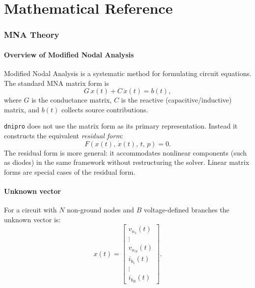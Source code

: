 \documentclass[11pt,a4paper]{article}
\newcommand{\project}{\texttt{dnipro}}
\newcommand{\mna}{Modified Nodal Analysis}
\begin{document}
\part{Mathematical Reference}

\section{MNA Theory}
\label{sec:mna-theory}

\subsection{Overview of Modified Nodal Analysis}

\mna{} is a systematic method for formulating circuit equations.
The standard MNA matrix form is
\begin{equation}
    G\,x(t) + C\,\dot{x}(t) = b(t),
\end{equation}
where \(G\) is the conductance matrix, \(C\) is the reactive (capacitive/inductive)
matrix, and \(b(t)\) collects source contributions.

\project{} does not use the matrix form as its primary representation.
Instead it constructs the equivalent \emph{residual form}:
\begin{equation}
    F\!\left(x(t),\,\dot{x}(t),\,t,\,p\right) = 0.
\end{equation}
The residual form is more general: it accommodates nonlinear components (such as
diodes) in the same framework without restructuring the solver.
Linear matrix forms are special cases of the residual form.

\subsection{Unknown vector}

For a circuit with \(N\) non-ground nodes and \(B\) voltage-defined branches
the unknown vector is:
\begin{equation}
    x(t) =
    \begin{bmatrix}
        v_{n_1}(t) \\ \vdots \\ v_{n_N}(t) \\
        i_{b_1}(t) \\ \vdots \\ i_{b_B}(t)
    \end{bmatrix}.
\end{equation}
\end{document}
